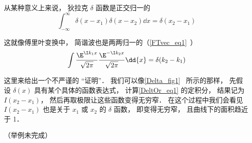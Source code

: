 

从某种意义上来说， 狄拉克 $\delta$ 函数是正交归一的
\begin{equation}\label{DeltOr_eq1}
\int_{-\infty}^{\infty}\delta(x - x_1) \delta(x - x_2) \dd{x} = \delta(x_2 - x_1)
\end{equation}

这就像傅里叶变换中， 简谐波也是两两归一的（\autoref{FTvec_eq1}~）
\begin{equation}
\int \frac{\E^{\I k_1 x}}{\sqrt{2\pi }} \frac{\E^{-\I k_2 x}}{\sqrt{2\pi }} \dd{x} = \delta (k_2 - k_1)
\end{equation}

这里来给出一个不严谨的 “证明”． 我们可以像\autoref{Delta_fig1}~ 所示的那样， 先假设 $\delta(x)$ 具有某个具体的函数表达式， 计算\autoref{DeltOr_eq1} 的定积分， 结果记为 $I(x_2 - x_1)$， 然后再取极限让这些函数变得无穷窄． 在这个过程中我们会看见 $I(x_2 - x_1)$ 也是关于 $x_1$ 或 $x_2$ 的 $\delta$ 函数， 即变得无穷窄， 且曲线下的面积趋近于 1．

（举例未完成）
